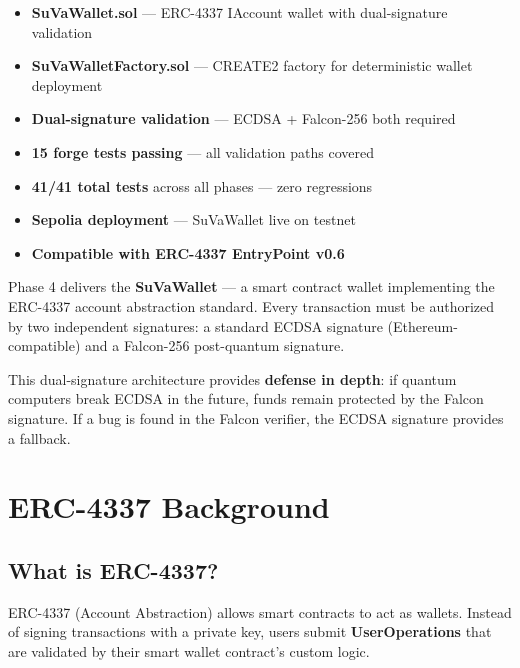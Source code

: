 \documentclass[11pt,a4paper]{article}
\begin{document}
\begin{resultbox}
\begin{itemize}
  \item[$\checkmark$] \textbf{SuVaWallet.sol} --- ERC-4337 IAccount wallet with dual-signature validation
  \item[$\checkmark$] \textbf{SuVaWalletFactory.sol} --- CREATE2 factory for deterministic wallet deployment
  \item[$\checkmark$] \textbf{Dual-signature validation} --- ECDSA + Falcon-256 both required
  \item[$\checkmark$] \textbf{15 forge tests passing} --- all validation paths covered
  \item[$\checkmark$] \textbf{41/41 total tests} across all phases --- zero regressions
  \item[$\checkmark$] \textbf{Sepolia deployment} --- SuVaWallet live on testnet
  \item[$\checkmark$] \textbf{Compatible with ERC-4337 EntryPoint v0.6}
\end{itemize}
\end{resultbox}

\vspace{0.5cm}

Phase 4 delivers the \textbf{SuVaWallet} --- a smart contract wallet implementing the ERC-4337
account abstraction standard. Every transaction must be authorized by two independent signatures:
a standard ECDSA signature (Ethereum-compatible) and a Falcon-256 post-quantum signature.

This dual-signature architecture provides \textbf{defense in depth}: if quantum computers break
ECDSA in the future, funds remain protected by the Falcon signature. If a bug is found in the
Falcon verifier, the ECDSA signature provides a fallback.

\section{ERC-4337 Background}

\subsection{What is ERC-4337?}

ERC-4337 (Account Abstraction) allows smart contracts to act as wallets. Instead of signing
transactions with a private key, users submit \textbf{UserOperations} that are validated by
their smart wallet contract's custom logic.
\end{document}
